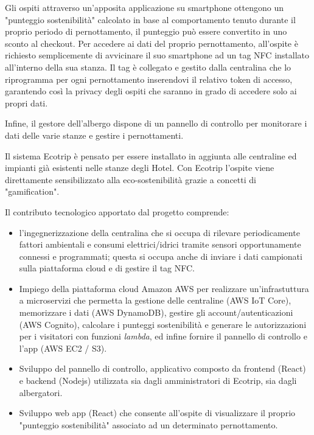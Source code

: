 Gli ospiti attraverso un'apposita applicazione su smartphone ottengono un "punteggio sostenibilità" calcolato in base al comportamento tenuto durante il proprio periodo di pernottamento, il punteggio 
può essere convertito in uno sconto al checkout. Per accedere ai dati del proprio pernottamento, all'ospite è richiesto semplicemente di avvicinare il suo smartphone ad un tag NFC installato all'interno della sua stanza.
Il tag è collegato e gestito dalla centralina che lo riprogramma per ogni pernottamento inserendovi il relativo token di accesso, garantendo così la privacy degli ospiti che saranno in grado di accedere solo ai propri dati.

Infine, il gestore dell'albergo dispone di un pannello di controllo per monitorare i dati delle varie stanze e gestire i pernottamenti.

Il sistema Ecotrip è pensato per essere installato in aggiunta alle centraline ed impianti già esistenti nelle stanze degli Hotel. 
Con Ecotrip l'ospite viene direttamente sensibilizzato alla eco-sostenibilità grazie a concetti di "gamification".


Il contributo tecnologico apportato dal progetto comprende:
\begin{itemize}
    \item l'ingegnerizzazione della centralina che si occupa di rilevare periodicamente fattori ambientali e consumi elettrici/idrici tramite sensori opportunamente connessi e programmati; questa si occupa anche di inviare i dati campionati sulla piattaforma cloud e di gestire il tag NFC. 
    \item Impiego della piattaforma cloud Amazon AWS per realizzare un'infrastuttura a microservizi che permetta la gestione delle centraline (AWS IoT Core), memorizzare i dati (AWS DynamoDB), gestire gli account/autenticazioni (AWS Cognito), calcolare i punteggi sostenibilità e generare le autorizzazioni per i visitatori con funzioni \textit{lambda}, ed infine fornire il pannello di controllo e l'app (AWS EC2 / S3).
    \item Sviluppo del pannello di controllo, applicativo composto da frontend (React) e backend (Nodejs) utilizzata sia dagli amministratori di Ecotrip, sia dagli albergatori. 
    \item Sviluppo web app (React) che consente all'ospite di visualizzare il proprio "punteggio sostenibilità" associato ad un determinato pernottamento.
\end{itemize}


\newpage